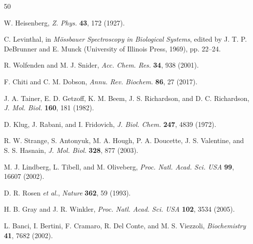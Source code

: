 \documentclass[twocolumn,aps,prx,superscriptaddress,longbibliography]{revtex4-2}
\theoremstyle{remark}
\begin{document}
\begin{thebibliography}{50}

W. Heisenberg, \textit{Z. Phys.} \textbf{43}, 172 (1927).

C. Levinthal, in \textit{M\"ossbauer Spectroscopy in Biological Systems},
edited by J. T. P. DeBrunner and E. Munck (University of Illinois Press,
1969), pp. 22--24.

R. Wolfenden and M. J. Snider, \textit{Acc. Chem. Res.} \textbf{34},
938 (2001).

F. Chiti and C. M. Dobson, \textit{Annu. Rev. Biochem.} \textbf{86},
27 (2017).

J. A. Tainer, E. D. Getzoff, K. M. Beem, J. S. Richardson, and
D. C. Richardson, \textit{J. Mol. Biol.} \textbf{160}, 181 (1982).

D. Klug, J. Rabani, and I. Fridovich, \textit{J. Biol. Chem.}
\textbf{247}, 4839 (1972).

R. W. Strange, S. Antonyuk, M. A. Hough, P. A. Doucette, J. S. Valentine,
and S. S. Hasnain, \textit{J. Mol. Biol.} \textbf{328}, 877 (2003).

M. J. Lindberg, L. Tibell, and M. Oliveberg, \textit{Proc. Natl. Acad.
Sci. USA} \textbf{99}, 16607 (2002).

D. R. Rosen \textit{et al.}, \textit{Nature} \textbf{362}, 59 (1993).

H. B. Gray and J. R. Winkler, \textit{Proc. Natl. Acad. Sci. USA}
\textbf{102}, 3534 (2005).

L. Banci, I. Bertini, F. Cramaro, R. Del Conte, and M. S. Viezzoli,
\textit{Biochemistry} \textbf{41}, 7682 (2002).

\end{thebibliography}
\end{document}
